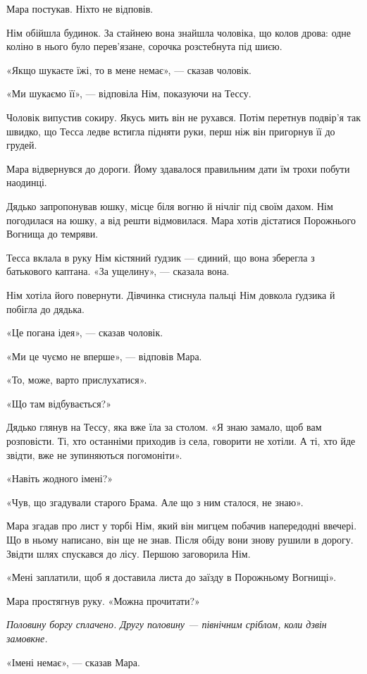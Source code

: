 \documentclass[10pt,a4paper]{article}
\begin{document}
Мара постукав. Ніхто не відповів.

Нім обійшла будинок. За стайнею вона знайшла чоловіка, що колов дрова: одне коліно в нього було перев’язане, сорочка розстебнута під шиєю.

«Якщо шукаєте їжі, то в мене немає», --- сказав чоловік.

«Ми шукаємо її», --- відповіла Нім, показуючи на Тессу.

Чоловік випустив сокиру. Якусь мить він не рухався. Потім перетнув подвір’я так швидко, що Тесса ледве встигла підняти руки, перш ніж він пригорнув її до грудей.

Мара відвернувся до дороги. Йому здавалося правильним дати їм трохи побути наодинці.

Дядько запропонував юшку, місце біля вогню й нічліг під своїм дахом. Нім погодилася на юшку, а від решти відмовилася. Мара хотів дістатися Порожнього Вогнища до темряви.

Тесса вклала в руку Нім кістяний ґудзик --- єдиний, що вона зберегла з батькового каптана. «За ущелину», --- сказала вона.

Нім хотіла його повернути. Дівчинка стиснула пальці Нім довкола ґудзика й побігла до дядька.

«Це погана ідея», --- сказав чоловік.

«Ми це чуємо не вперше», --- відповів Мара.

«То, може, варто прислухатися».

«Що там відбувається?»

Дядько глянув на Тессу, яка вже їла за столом. «Я знаю замало, щоб вам розповісти. Ті, хто останніми приходив із села, говорити не хотіли. А ті, хто йде звідти, вже не зупиняються погомоніти».

«Навіть жодного імені?»

«Чув, що згадували старого Брама. Але що з ним сталося, не знаю».

Мара згадав про лист у торбі Нім, який він мигцем побачив напередодні ввечері. Що в ньому написано, він ще не знав.
Після обіду вони знову рушили в дорогу. Звідти шлях спускався до лісу. Першою заговорила Нім.

«Мені заплатили, щоб я доставила листа до заїзду в Порожньому Вогнищі».

Мара простягнув руку. «Можна прочитати?»

\emph{Половину боргу сплачено. Другу половину --- північним сріблом, коли дзвін замовкне.}

«Імені немає», --- сказав Мара.
\end{document}
